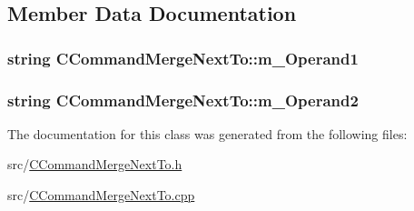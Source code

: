 \subsection{Member Data Documentation}
\subsubsection[{\texorpdfstring{m\+\_\+\+Operand1}{m_Operand1}}]{\setlength{\rightskip}{0pt plus 5cm}string C\+Command\+Merge\+Next\+To\+::m\+\_\+\+Operand1\hspace{0.3cm}{\ttfamily [private]}}\hypertarget{classCCommandMergeNextTo_ae967c718f405476f0a833994061af64f}{}\label{classCCommandMergeNextTo_ae967c718f405476f0a833994061af64f}
\subsubsection[{\texorpdfstring{m\+\_\+\+Operand2}{m_Operand2}}]{\setlength{\rightskip}{0pt plus 5cm}string C\+Command\+Merge\+Next\+To\+::m\+\_\+\+Operand2\hspace{0.3cm}{\ttfamily [private]}}\hypertarget{classCCommandMergeNextTo_a201710d63a46fee8603ee4b625e8e189}{}\label{classCCommandMergeNextTo_a201710d63a46fee8603ee4b625e8e189}


The documentation for this class was generated from the following files\+:\begin{DoxyCompactItemize}
\item 
src/\hyperlink{CCommandMergeNextTo_8h}{C\+Command\+Merge\+Next\+To.\+h}\item 
src/\hyperlink{CCommandMergeNextTo_8cpp}{C\+Command\+Merge\+Next\+To.\+cpp}\end{DoxyCompactItemize}
